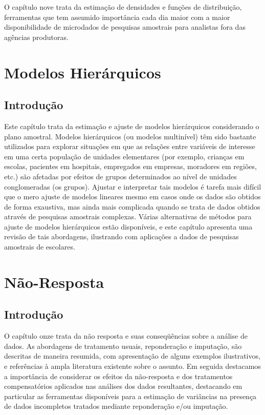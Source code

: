 \documentclass[]{book}
\theoremstyle{definition}
\theoremstyle{definition}
\theoremstyle{definition}
\theoremstyle{remark}
\begin{document}
O capítulo nove trata da estimação de densidades e funções de
distribuição, ferramentas que tem assumido importância cada dia maior
com a maior disponibilidade de microdados de pesquisas amostrais para
analistas fora das agências produtoras.

\chapter{Modelos Hierárquicos}\label{modelos-hierarquicos}

\section{Introdução}\label{introducao-4}

Este capítulo trata da estimação e ajuste de modelos hierárquicos
considerando o plano amostral. Modelos hierárquicos (ou modelos
multinível) têm sido bastante utilizados para explorar situações em que
as relações entre variáveis de interesse em uma certa população de
unidades elementares (por exemplo, crianças em escolas, pacientes em
hospitais, empregados em empresas, moradores em regiões, etc.) são
afetadas por efeitos de grupos determinados ao nível de unidades
conglomeradas (os grupos). Ajustar e interpretar tais modelos é tarefa
mais difícil que o mero ajuste de modelos lineares mesmo em casos onde
os dados são obtidos de forma exaustiva, mas ainda mais complicada
quando se trata de dados obtidos através de pesquisas amostrais
complexas. Várias alternativas de métodos para ajuste de modelos
hierárquicos estão disponíveis, e este capítulo apresenta uma revisão de
tais abordagens, ilustrando com aplicações a dados de pesquisas
amostrais de escolares.

\chapter{Não-Resposta}\label{nao-resposta}

\section{Introdução}\label{introducao-5}

O capítulo onze trata da não resposta e suas conseqüências sobre a
análise de dados. As abordagens de tratamento usuais, reponderação e
imputação, são descritas de maneira resumida, com apresentação de alguns
exemplos ilustrativos, e referências à ampla literatura existente sobre
o assunto. Em seguida destacamos a importância de considerar os efeitos
da não-resposta e dos tratamentos compensatórios aplicados nas análises
dos dados resultantes, destacando em particular as ferramentas
disponíveis para a estimação de variâncias na presença de dados
incompletos tratados mediante reponderação e/ou imputação.
\end{document}
